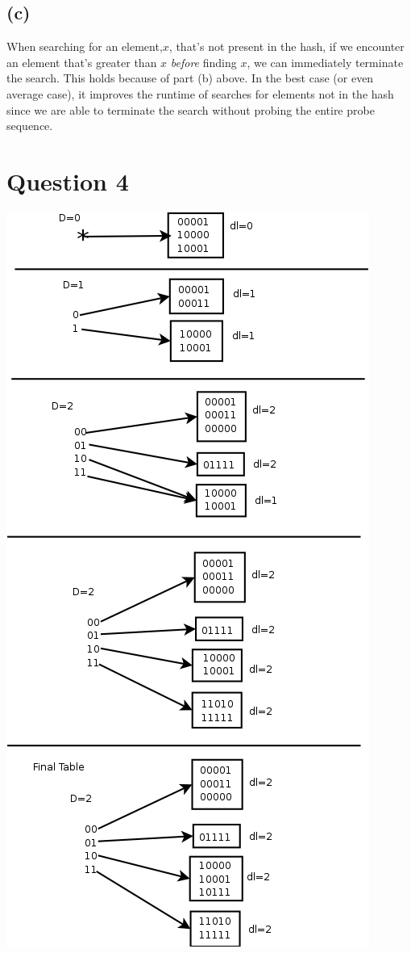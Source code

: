 \documentclass{article}[12pt]
\begin{document}
\subsection*{(c)}
When searching for an element,$x$, that's not present in the hash, if we encounter an element that's greater than $x$ \emph{before} finding $x$, we can immediately terminate the search. This holds because of part (b) above. In the best case (or even average case), it improves the runtime of searches for elements not in the hash since we are able to terminate the search without probing the entire probe sequence.

\section*{Question 4}
\includegraphics[scale=0.4]{a4q4.png}
\end{document}

